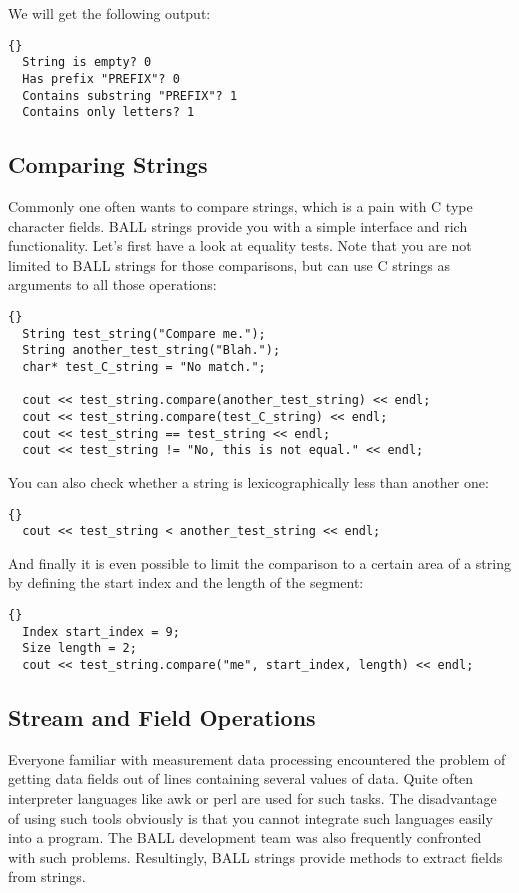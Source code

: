\noindent
We will get the following output:

\begin{lstlisting}{}
  String is empty? 0
  Has prefix "PREFIX"? 0
  Contains substring "PREFIX"? 1
  Contains only letters? 1
\end{lstlisting}


\subsection{Comparing Strings}

Commonly one often wants to compare strings, which is a pain with C type
character fields. BALL strings provide you with a simple interface and rich
functionality. Let's first have a look at equality tests. Note that you are
not limited to BALL strings for those comparisons, but can use C strings
as arguments to all those operations:
\begin{lstlisting}{}
  String test_string("Compare me.");
  String another_test_string("Blah.");
  char* test_C_string = "No match.";

  cout << test_string.compare(another_test_string) << endl;
  cout << test_string.compare(test_C_string) << endl;
  cout << test_string == test_string << endl;
  cout << test_string != "No, this is not equal." << endl;
\end{lstlisting}
You can also check whether a string is lexicographically less than another
one:
\begin{lstlisting}{}
  cout << test_string < another_test_string << endl;
\end{lstlisting}
And finally it is even possible to limit the comparison to a certain area of
a string by defining the start index and the length of the segment:
\begin{lstlisting}{}
  Index start_index = 9;
  Size length = 2;
  cout << test_string.compare("me", start_index, length) << endl;
\end{lstlisting}

\subsection{Stream and Field Operations}

Everyone familiar with measurement data processing encountered the problem of
getting data fields out of lines containing several values of data. Quite
often interpreter languages like awk or perl are used for such tasks. The
disadvantage of using such tools obviously is that you cannot integrate such
languages easily into a \CPP program. The BALL development team was also
frequently confronted with such problems. Resultingly, BALL strings provide
methods to extract fields from strings.

